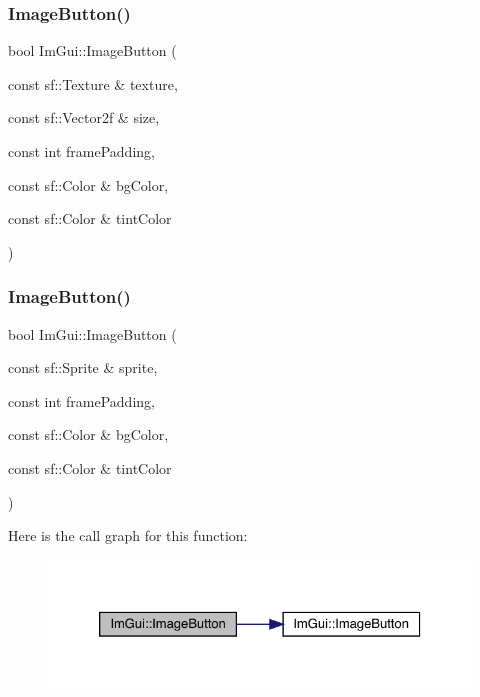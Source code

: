 \subsubsection{\texorpdfstring{Image\+Button()}{ImageButton()}\hspace{0.1cm}{\footnotesize\ttfamily [2/4]}}
{\footnotesize\ttfamily bool Im\+Gui\+::\+Image\+Button (\begin{DoxyParamCaption}\item[{const sf\+::\+Texture \&}]{texture,  }\item[{const sf\+::\+Vector2f \&}]{size,  }\item[{const int}]{frame\+Padding,  }\item[{const sf\+::\+Color \&}]{bg\+Color,  }\item[{const sf\+::\+Color \&}]{tint\+Color }\end{DoxyParamCaption})}

\mbox{\label{namespace_im_gui_ae1ea307f7616cf2143040c02f40d676a}} 
\subsubsection{\texorpdfstring{Image\+Button()}{ImageButton()}\hspace{0.1cm}{\footnotesize\ttfamily [3/4]}}
{\footnotesize\ttfamily bool Im\+Gui\+::\+Image\+Button (\begin{DoxyParamCaption}\item[{const sf\+::\+Sprite \&}]{sprite,  }\item[{const int}]{frame\+Padding,  }\item[{const sf\+::\+Color \&}]{bg\+Color,  }\item[{const sf\+::\+Color \&}]{tint\+Color }\end{DoxyParamCaption})}

Here is the call graph for this function\+:
\nopagebreak
\begin{figure}[H]
\begin{center}
\leavevmode
\includegraphics[width=326pt]{df/d13/namespace_im_gui_ae1ea307f7616cf2143040c02f40d676a_cgraph}
\end{center}
\end{figure}
\mbox{\label{namespace_im_gui_a37ef3e433d07343a693fde368fe68608}} 
